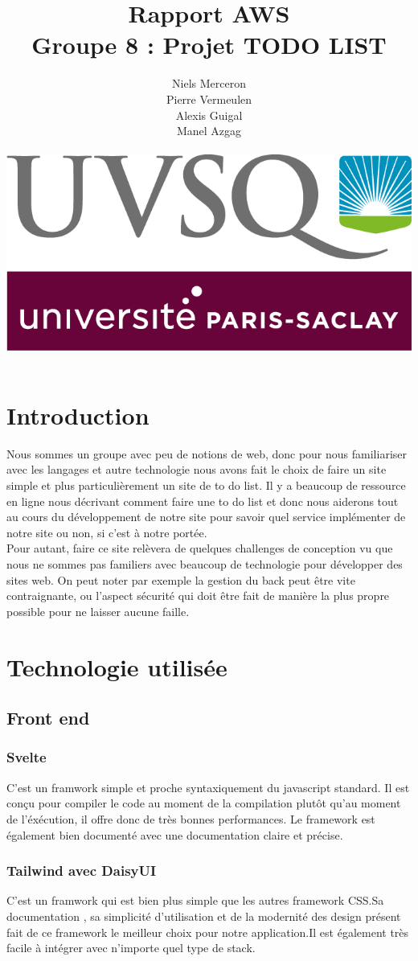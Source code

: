 \documentclass[a4paper,12pt]{report}
\date{}
\title{Rapport AWS \\ Groupe 8 : Projet TODO LIST}
\author{Niels Merceron \\ Pierre Vermeulen \\ Alexis Guigal \\ Manel Azgag \\ \\  \includegraphics[scale=0.20]{logo-UVSQ-2020-RVB.png}}
\begin{document}
\maketitle

\newpage
\tableofcontents
\chapter{Introduction}

Nous sommes un groupe avec peu de notions de web, donc pour nous familiariser avec les langages et autre technologie nous avons fait le choix de faire un site simple et plus particulièrement un site de to do list. Il y a beaucoup de ressource en ligne nous décrivant comment faire une to do list et donc nous aiderons tout au cours du développement de notre site pour savoir quel service implémenter de notre site ou non, si c'est à notre portée.
\\Pour autant, faire ce site relèvera de quelques challenges de conception vu que nous ne sommes pas familiers avec beaucoup de technologie pour développer des sites web.
On peut noter par exemple la gestion du back peut être vite contraignante, ou l'aspect sécurité qui doit être fait de manière la plus propre possible pour ne laisser aucune faille.


\chapter{Technologie utilisée}
\section{Front end}

\subsection{Svelte}
C'est un framwork simple et proche syntaxiquement du javascript standard. Il est conçu pour compiler le code au moment de la compilation plutôt qu'au moment de l'éxécution, il offre donc de très bonnes performances. Le framework est également bien documenté avec une documentation claire et précise.

\subsection{Tailwind avec DaisyUI}
C'est un framwork qui est bien plus simple que les autres framework CSS.Sa documentation , sa simplicité d'utilisation et de la modernité des design présent fait de ce framework le meilleur choix pour notre application.Il est également très facile à intégrer avec n'importe quel type de stack.
\end{document}
